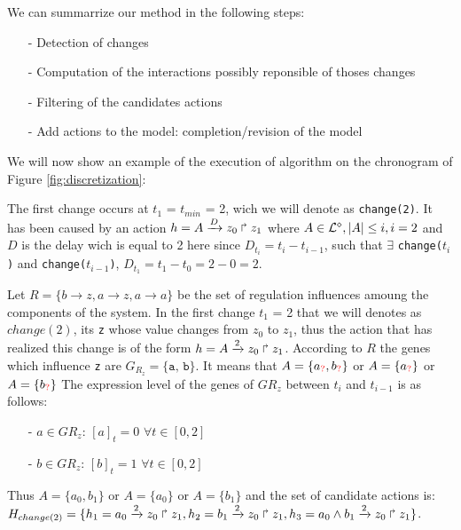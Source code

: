 We can summarrize our method in the following steps:
\begin{itemize}
\item[-] Detection of changes
\item[-] Computation of the interactions possibly reponsible of thoses changes
\item[-] Filtering of the candidates actions
\item[-] Add actions to the model: completion/revision of the model
\end{itemize}


We will now show an example of the execution of algorithm on the chronogram of Figure \ref{fig:discretization}:


The first change occurs at $t_1$ = $t_{min}$ = 2,
wich we will denote as \texttt{change(2)}.
It has been caused by an action $h = A\xrightarrow{D} z_0 \Rsh z_1$
where $ A \in \mathcal{L}^{\diamond}, | A| \leq i, i=2$ and $D$ is the delay wich is equal to 2 here since
$D_{t_i}=t_i - t_{i-1}$, such that $\exists$ \texttt{change($t_i$)} and \texttt{change($t_{i-1}$)},
$D_{t_1}= t_1 - t_0 = 2 - 0 = 2$.

Let $R=\{ b \rightarrow z, a \rightarrow z, a \rightarrow a \}$
be the set of regulation influences amoung the components of the system.
%
In the first change $t_1$ = 2 that we will denotes as $change(2)$,
its \texttt{z} whose value changes from $z_0$ to $z_1$, thus the action that has realized this change is of the form $h = A\xrightarrow{2} z_0 \Rsh z_1$. According to $R$ the genes which influence \texttt{z} are $G_{R_z} = \{\texttt{a, b}\}$. It means that $A= \{ a_{\textcolor{red}{?}}, b_{\textcolor{red}{?}} \} $ or $A= \{ a_{\textcolor{red}{?}} \} $ or $A= \{ b_{\textcolor{red}{?}} \} $
%
The expression level of the genes of $G{R_z}$ between $t_i$ and $t_{i-1}$ is as follows:
\begin{itemize}
\item[-] $a \in  G{R_z}$: $[a]_t=0$ $\forall t \in [0,2] $
\item[-] $b \in  G{R_z}$: $[b]_t=1$ $\forall t \in [0,2] $
\end{itemize}
%
Thus $A= \{ a_0, b_1 \} $ or $A= \{ a_0\} $ or $A= \{ b_1 \} $ and the set of candidate actions is:
$H_{change(2)} = \{ h_1=a_0\xrightarrow{2} z_0 \Rsh z_1
, h_2=b_1\xrightarrow{2} z_0 \Rsh z_1
, h_3=a_0 \wedge b_1 \xrightarrow{2} z_0 \Rsh z_1 \}$.

